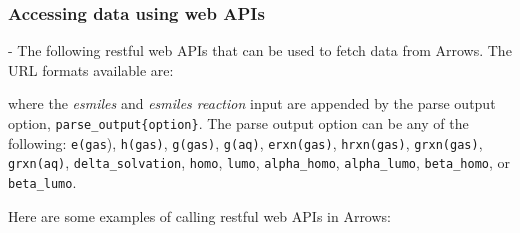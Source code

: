 \documentclass[runningheads,a4paper]{llncs}
\begin{document}
\subsubsection{Accessing data using web APIs} - The following restful web APIs that can be used to fetch data from Arrows. The URL formats available are:
\newline

\noindent{}
\newline

\noindent where the \textit{esmiles} and \textit{esmiles reaction} input are appended by the parse output option, \verb|parse_output{option}|. The parse output option can be any of the following: \verb|e(gas|), \verb|h(gas)|, \verb|g(gas)|, \verb|g(aq)|, \verb|erxn(gas)|, \verb|hrxn(gas)|, \verb|grxn(gas)|, \verb|grxn(aq)|, \verb|delta_solvation|, \verb|homo|, \verb|lumo|, \verb|alpha_homo|, \verb|alpha_lumo|, \verb|beta_homo|, or \verb|beta_lumo|.  

Here are some examples of calling  restful web APIs in Arrows:
\newline
\end{document}
